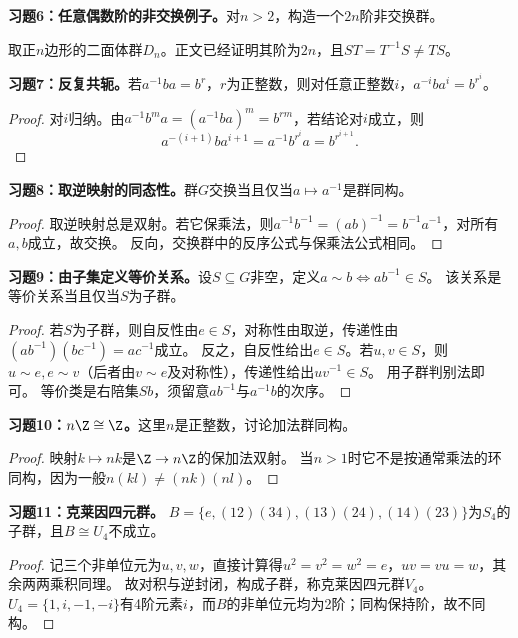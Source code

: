 \begin{problem}
\textbf{习题6：任意偶数阶的非交换例子。}对$n>2$，构造一个$2n$阶非交换群。
\end{problem}
\begin{solution}
取正$n$边形的二面体群$D_n$。正文已经证明其阶为$2n$，且$ST=T^{-1}S\neq TS$。
\end{solution}

\begin{problem}
\textbf{习题7：反复共轭。}若$a^{-1}ba=b^r$，$r$为正整数，则对任意正整数$i$，$a^{-i}ba^i=b^{r^i}$。
\end{problem}
\begin{proof}
对$i$归纳。由$a^{-1}b^ma=(a^{-1}ba)^m=b^{rm}$，若结论对$i$成立，则
\[
a^{-(i+1)}ba^{i+1}=a^{-1}b^{r^i}a=b^{r^{i+1}}.
\]
\end{proof}

\begin{problem}
\textbf{习题8：取逆映射的同态性。}群$G$交换当且仅当$a\mapsto a^{-1}$是群同构。
\end{problem}
\begin{proof}
取逆映射总是双射。若它保乘法，则$a^{-1}b^{-1}=(ab)^{-1}=b^{-1}a^{-1}$，对所有$a,b$成立，故交换。
反向，交换群中的反序公式与保乘法公式相同。
\end{proof}

\begin{problem}
\textbf{习题9：由子集定义等价关系。}设$S\subseteq G$非空，定义$a\sim b\iff ab^{-1}\in S$。
该关系是等价关系当且仅当$S$为子群。
\end{problem}
\begin{proof}
若$S$为子群，则自反性由$e\in S$，对称性由取逆，传递性由
$(ab^{-1})(bc^{-1})=ac^{-1}$成立。
反之，自反性给出$e\in S$。若$u,v\in S$，则$u\sim e,e\sim v$（后者由$v\sim e$及对称性），传递性给出$uv^{-1}\in S$。
用子群判别法即可。
等价类是右陪集$Sb$，须留意$ab^{-1}$与$a^{-1}b$的次序。
\end{proof}

\begin{problem}
\textbf{习题10：$n\Z\cong\Z$。}这里$n$是正整数，讨论加法群同构。
\end{problem}
\begin{proof}
映射$k\mapsto nk$是$\Z\to n\Z$的保加法双射。
当$n>1$时它不是按通常乘法的环同构，因为一般$n(kl)\neq(nk)(nl)$。
\end{proof}

\begin{problem}
\textbf{习题11：克莱因四元群。}
$B=\{e,(12)(34),(13)(24),(14)(23)\}$为$S_4$的子群，且$B\cong U_4$不成立。
\end{problem}
\begin{proof}
记三个非单位元为$u,v,w$，直接计算得$u^2=v^2=w^2=e$，$uv=vu=w$，其余两两乘积同理。
故对积与逆封闭，构成子群，称克莱因四元群$V_4$。
$U_4=\{1,i,-1,-i\}$有4阶元素$i$，而$B$的非单位元均为2阶；同构保持阶，故不同构。
\end{proof}

